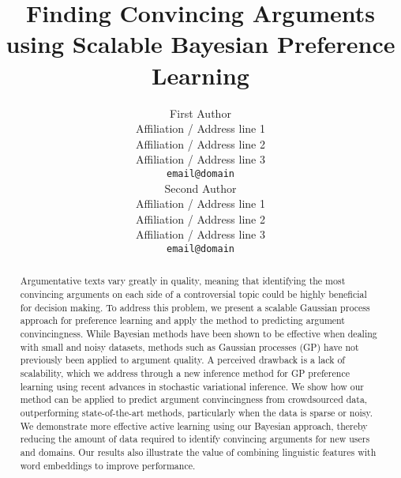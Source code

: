 \documentclass[11pt,letterpaper]{article}
\title{ 
Finding Convincing Arguments using Scalable Bayesian Preference Learning
}
\author{First Author \\
  Affiliation / Address line 1 \\
  Affiliation / Address line 2 \\
  Affiliation / Address line 3 \\
  {\tt email@domain} \\\And
  Second Author \\
  Affiliation / Address line 1 \\
  Affiliation / Address line 2 \\
  Affiliation / Address line 3 \\
  {\tt email@domain} \\}
\date{}
\begin{document}
\maketitle

\begin{abstract}


Argumentative texts vary greatly in quality, 
meaning that identifying the most convincing arguments 
on each side of a controversial topic could be highly beneficial for decision making.
To address this problem, we present a scalable Gaussian process approach for preference learning 
and apply the method to predicting argument convincingness. 
While Bayesian methods have been shown to be effective when dealing with small and noisy datasets,
methods such as Gaussian processes (GP) have not previously been applied to argument quality.
A perceived drawback is a lack of scalability, which we address through a new
inference method for GP preference learning using recent advances in stochastic variational inference.
We show how our method can be applied to predict argument convincingness from crowdsourced data, 
outperforming state-of-the-art methods, particularly when the data is sparse or noisy.  
We demonstrate more effective active learning using our Bayesian approach, 
thereby reducing the amount of data required to identify convincing arguments for new users and domains.
Our results also illustrate the value of combining linguistic features with word embeddings to improve performance. 

\end{abstract}
\end{document}

